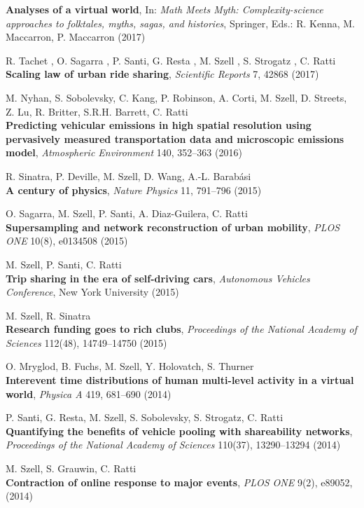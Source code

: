\documentclass[10pt,a4paper]{article}
\begin{document}
\begin{etaremune}
    \textbf{Analyses of a virtual world}, In: \textit{Math Meets Myth: Complexity-science approaches to folktales, myths, sagas, and histories}, Springer, Eds.: R. Kenna, M. Maccarron, P. Maccarron (2017)
\item R. Tachet , O. Sagarra , P. Santi, G. Resta , M. Szell , S. Strogatz , C. Ratti\\
    \textbf{Scaling law of urban ride sharing}, \textit{Scientific Reports} 7, 42868 (2017)
\item M. Nyhan, S. Sobolevsky, C. Kang, P. Robinson, A. Corti, M. Szell, D. Streets, Z. Lu, R. Britter, S.R.H. Barrett, C. Ratti\\
    \textbf{Predicting vehicular emissions in high spatial resolution using pervasively measured transportation data and microscopic emissions model}, \textit{Atmospheric Environment} 140, 352--363 (2016)
\item R. Sinatra, P. Deville, M. Szell, D. Wang, A.-L. Barab\'asi\\
    \textbf{A century of physics}, \textit{Nature Physics} 11, 791--796 (2015)
\item O. Sagarra, M. Szell, P. Santi, A. Diaz-Guilera, C. Ratti\\
    \textbf{Supersampling and network reconstruction of urban mobility}, \textit{PLOS ONE} 10(8), e0134508 (2015)
\item M. Szell, P. Santi, C. Ratti\\
\textbf{Trip sharing in the era of self-driving cars}, \textit{Autonomous Vehicles Conference}, New York University (2015)
\item M. Szell, R. Sinatra\\
    \textbf{Research funding goes to rich clubs}, \textit{Proceedings of the National Academy of Sciences} 112(48), 14749--14750 (2015)  
\item O. Mryglod, B. Fuchs, M. Szell, Y. Holovatch, S. Thurner\\
    \textbf{Interevent time distributions of human multi-level activity in a virtual world}, \textit{Physica A} 419, 681--690 (2014)
\item P. Santi, G. Resta, M. Szell, S. Sobolevsky, S. Strogatz, C. Ratti\\
    \textbf{Quantifying the benefits of vehicle pooling with shareability networks},  \textit{Proceedings of the National Academy of Sciences} 110(37), 13290--13294 (2014)
\item M. Szell, S. Grauwin, C. Ratti\\
    \textbf{Contraction of online response to major events}, \textit{PLOS ONE} 9(2), e89052, (2014)

\end{etaremune}
\end{document}
